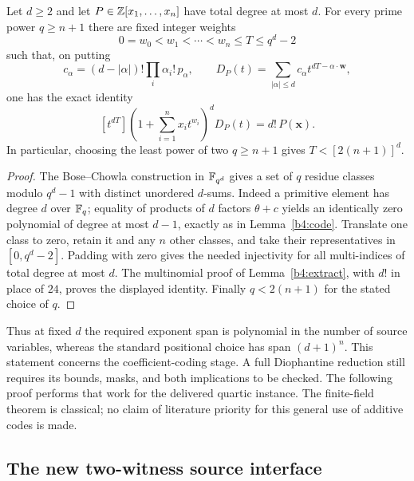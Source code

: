 \begin{proposition}
\label{b4:generalspan}
Let $d\ge2$ and let $P\in\mathbb Z[x_1,\ldots,x_n]$ have total degree at
most $d$.  For every prime power $q\ge n+1$ there are fixed
integer weights
\[
 0=w_0<w_1<\cdots<w_n\le T\le q^d-2
\]
such that, on putting
\[
 c_\alpha=(d-|\alpha|)!\prod_i\alpha_i!\,p_\alpha,
 \qquad
 D_P(t)=\sum_{|\alpha|\le d}c_\alpha t^{dT-\alpha\cdot\mathbf w},
\]
one has the exact identity
\[
 [t^{dT}]
 \left(1+\sum_{i=1}^n x_it^{w_i}\right)^dD_P(t)=d!\,P(\mathbf x).
\]
In particular, choosing the least power of two $q\ge n+1$ gives
$T<[2(n+1)]^d$.
\end{proposition}

\begin{proof}
The Bose--Chowla construction in $\mathbb F_{q^d}$ gives a set of $q$
residue classes modulo $q^d-1$ with distinct unordered $d$-sums.
Indeed a primitive element has degree $d$ over $\mathbb F_q$;
equality of products of $d$ factors $\theta+c$ yields an
identically zero polynomial of degree at most $d-1$, exactly
as in Lemma~\ref{b4:code}.  Translate one class to zero, retain
it and any $n$ other classes, and take their representatives in
$[0,q^d-2]$.  Padding with zero gives the needed injectivity
for all multi-indices of total degree at most $d$.
The multinomial proof of Lemma~\ref{b4:extract}, with $d!$
in place of $24$, proves the displayed identity.  Finally
$q<2(n+1)$ for the stated choice of $q$.
\end{proof}

Thus at fixed $d$ the required exponent span is polynomial in
the number of source variables, whereas the standard positional
choice has span $(d+1)^n$.  This statement concerns the
coefficient-coding stage.  A full Diophantine reduction still
requires its bounds, masks, and both implications to be checked.
The following proof performs that work for the delivered quartic
instance.  The finite-field theorem is classical; no claim of
literature priority for this general use of additive codes is made.

\subsection{The new two-witness source interface}
\label{b4:interface}

